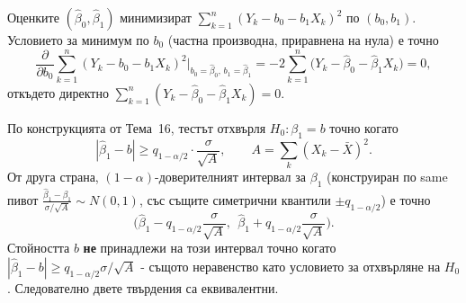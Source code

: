 \begin{proofbox}
Оценките $(\hat\beta_0,\hat\beta_1)$ минимизират $\sum_{k=1}^n(Y_k-
b_0-b_1X_k)^2$ по $(b_0,b_1)$. Условието за минимум по $b_0$
(частна производна, приравнена на нула) е точно
\[
  \frac{\partial}{\partial b_0}\sum_{k=1}^n(Y_k-b_0-b_1X_k)^2
  \bigg|_{b_0=\hat\beta_0,\,b_1=\hat\beta_1} = -2\sum_{k=1}^n\big(
  Y_k-\hat\beta_0-\hat\beta_1X_k\big) = 0,
\]
откъдето директно $\sum_{k=1}^n(Y_k-\hat\beta_0-\hat\beta_1X_k)=0$.
\qedbg
\end{proofbox}

\begin{proofbox}
По конструкцията от Тема~16, тестът отхвърля $H_0:\beta_1=b$ точно
когато
\[
  |\hat\beta_1-b| \ge q_{1-\alpha/2}\cdot\frac{\sigma}{\sqrt A},
  \qquad A=\sum_k(X_k-\bar X)^2.
\]
От друга страна, $(1-\alpha)$-доверителният интервал за $\beta_1$
(конструиран по same пивот $\tfrac{\hat\beta_1-\beta_1}{\sigma/\sqrt
A}\sim N(0,1)$, със същите симетрични квантили $\pm q_{1-\alpha/2}$)
е точно
\[
  \Big(\hat\beta_1-q_{1-\alpha/2}\frac\sigma{\sqrt A},\ \ \hat\beta_1
  +q_{1-\alpha/2}\frac\sigma{\sqrt A}\Big).
\]
Стойността $b$ \textbf{не} принадлежи на този интервал точно когато
$|\hat\beta_1-b|\ge q_{1-\alpha/2}\sigma/\sqrt A$ - същото
неравенство като условието за отхвърляне на $H_0$. Следователно
двете твърдения са еквивалентни. \qedbg
\end{proofbox}
